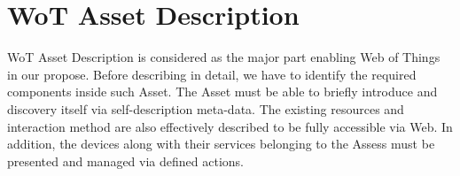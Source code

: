 \section{WoT Asset Description}
WoT Asset Description is considered as the major part enabling Web of Things in our propose. Before describing in detail, we have to identify the required components inside such Asset. The Asset must be able to briefly introduce and discovery itself via self-description meta-data. The existing resources and interaction method are also effectively described to be fully accessible via Web. In addition, the devices along with their services belonging to the Assess must be presented and managed via defined actions. 

